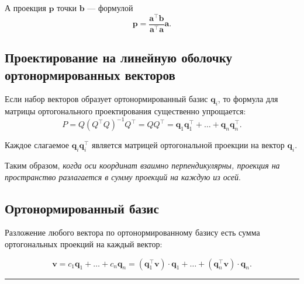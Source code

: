 \documentclass[11pt,a4paper]{article}
\begin{document}
А проекция \(\mathbf{p}\) точки \(\mathbf{b}\) --- формулой
\[ \mathbf{p} = \frac{\mathbf{a^\top} \mathbf{b}}{\mathbf{a^\top}\mathbf{a}}\mathbf{a}. \]

    \hypertarget{ux43fux440ux43eux435ux43aux442ux438ux440ux43eux432ux430ux43dux438ux435-ux43dux430-ux43bux438ux43dux435ux439ux43dux443ux44e-ux43eux431ux43eux43bux43eux447ux43aux443-ux43eux440ux442ux43eux43dux43eux440ux43cux438ux440ux43eux432ux430ux43dux43dux44bux445-ux432ux435ux43aux442ux43eux440ux43eux432}{%
\subsection{Проектирование на линейную оболочку ортонормированных
векторов}\label{ux43fux440ux43eux435ux43aux442ux438ux440ux43eux432ux430ux43dux438ux435-ux43dux430-ux43bux438ux43dux435ux439ux43dux443ux44e-ux43eux431ux43eux43bux43eux447ux43aux443-ux43eux440ux442ux43eux43dux43eux440ux43cux438ux440ux43eux432ux430ux43dux43dux44bux445-ux432ux435ux43aux442ux43eux440ux43eux432}}

Если набор векторов образует ортонормированный базис \(\mathbf{q}_i\),
то формула для матрицы ортогонального проектирования существенно
упрощается: \[
  P = Q (Q^\top Q)^{-1} Q^\top = QQ^\top = \mathbf{q}_1 \mathbf{q}_1^\top + \ldots + \mathbf{q}_n \mathbf{q}_n^\top.
\]

Каждое слагаемое \(\mathbf{q}_i \mathbf{q}_i^\top\) является матрицей
ортогональной проекции на вектор \(\mathbf{q}_i\).

Таким образом, \emph{когда оси координат взаимно перпендикулярны,
проекция на пространство разлагается в сумму проекций на каждую из
осей}.

    \hypertarget{ux43eux440ux442ux43eux43dux43eux440ux43cux438ux440ux43eux432ux430ux43dux43dux44bux439-ux431ux430ux437ux438ux441}{%
\subsection{Ортонормированный
базис}\label{ux43eux440ux442ux43eux43dux43eux440ux43cux438ux440ux43eux432ux430ux43dux43dux44bux439-ux431ux430ux437ux438ux441}}

Разложение любого вектора по ортонормированному базису есть сумма
ортогональных проекций на каждый вектор:

\[
  \mathbf{v} = c_1 \mathbf{q}_1 + \ldots + c_n \mathbf{q}_n = (\mathbf{q}_1^\top \mathbf{v}) \cdot \mathbf{q}_1 + \ldots + (\mathbf{q}_n^\top \mathbf{v}) \cdot \mathbf{q}_n.
\]

    \begin{center}\rule{0.5\linewidth}{0.5pt}\end{center}
\end{document}
